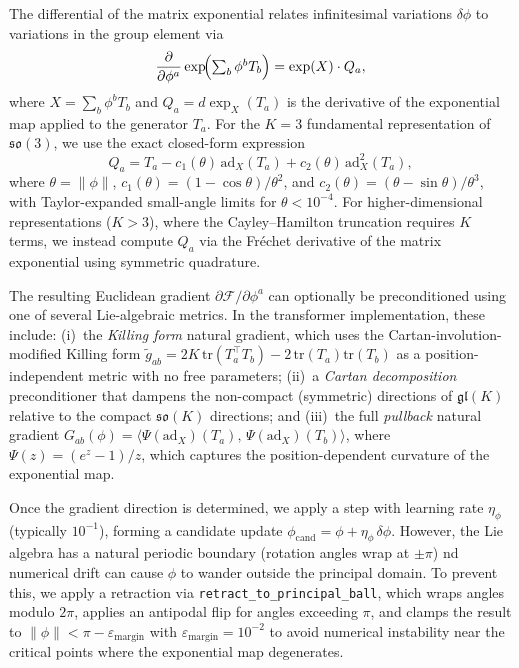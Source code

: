 \documentclass[twoside,11pt]{article}
\begin{document}
The differential of the matrix exponential relates infinitesimal variations $\delta \phi$ to variations in the group element via
\begin{equation}
\frac{\partial}{\partial \phi^a}\exp\!\Bigl(\textstyle\sum_b \phi^b T_b\Bigr) = \exp(X)\cdot Q_a,
\end{equation}
where $X = \sum_b \phi^b T_b$ and $Q_a = d\exp_X(T_a)$ is the derivative of the exponential map applied to the generator $T_a$.  For the $K\!=\!3$ fundamental representation of $\mathfrak{so}(3)$, we use the exact closed-form expression
\begin{equation}
Q_a = T_a - c_1(\theta)\,\mathrm{ad}_X(T_a) + c_2(\theta)\,\mathrm{ad}_X^2(T_a),
\end{equation}
where $\theta = \|\phi\|$, $c_1(\theta) = (1-\cos\theta)/\theta^2$, and $c_2(\theta) = (\theta - \sin\theta)/\theta^3$, with Taylor-expanded small-angle limits for $\theta < 10^{-4}$.  For higher-dimensional representations ($K > 3$), where the Cayley--Hamilton truncation requires $K$ terms, we instead compute $Q_a$ via the Fr\'{e}chet derivative of the matrix exponential using symmetric quadrature.

The resulting Euclidean gradient $\partial\mathcal{F}/\partial\phi^a$ can optionally be preconditioned using one of several Lie-algebraic metrics.  In the transformer implementation, these include: (i)~the \emph{Killing form} natural gradient, which uses the Cartan-involution-modified Killing form $\tilde{g}_{ab} = 2K\,\mathrm{tr}(T_a^\top T_b) - 2\,\mathrm{tr}(T_a)\mathrm{tr}(T_b)$ as a position-independent metric with no free parameters; (ii)~a \emph{Cartan decomposition} preconditioner that dampens the non-compact (symmetric) directions of $\mathfrak{gl}(K)$ relative to the compact $\mathfrak{so}(K)$ directions; and (iii)~the full \emph{pullback} natural gradient $G_{ab}(\phi) = \langle \Psi(\mathrm{ad}_X)(T_a),\, \Psi(\mathrm{ad}_X)(T_b) \rangle$, where $\Psi(z) = (e^z - 1)/z$, which captures the position-dependent curvature of the exponential map.

Once the gradient direction is determined, we apply a step with learning rate $\eta_\phi$ (typically $10^{-1}$), forming a candidate update $\phi_{\text{cand}} = \phi + \eta_\phi\,\delta \phi$. However, the Lie algebra has a natural periodic boundary (rotation angles wrap at $\pm \pi$) nd numerical drift can cause $\phi$ to wander outside the principal domain. To prevent this, we apply a retraction via \texttt{retract\_to\_principal\_ball}, which wraps angles modulo $2\pi$, applies an antipodal flip for angles exceeding $\pi$, and clamps the result to $\|\phi\| < \pi - \varepsilon_{\mathrm{margin}}$ with $\varepsilon_{\mathrm{margin}} = 10^{-2}$ to avoid numerical instability near the critical points where the exponential map degenerates.
\end{document}
